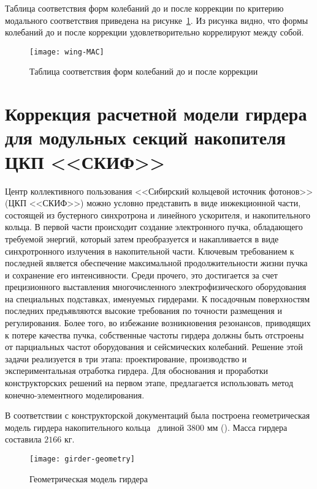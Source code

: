 Таблица соответствия форм колебаний до и после коррекции по критерию модального соответствия приведена на рисунке~\ref{fig:wing-MAC}. Из рисунка видно, что формы колебаний до и после коррекции удовлетворительно коррелируют между собой.

\begin{figure}[H]
	\centerfloat
	\texttt{[image: wing-MAC]}
	\caption{Таблица соответствия форм колебаний до и после коррекции} \label{fig:wing-MAC}
\end{figure}

\section{Коррекция расчетной модели гирдера для модульных секций накопителя ЦКП <<СКИФ>>}

Центр коллективного пользования <<Сибирский кольцевой источник фотонов>> (ЦКП <<СКИФ>>) можно условно представить в виде инжекционной части, состоящей из бустерного синхротрона и линейного ускорителя, и накопительного кольца. В первой части происходит создание электронного пучка, обладающего требуемой энергий, который затем преобразуется и накапливается в виде синхротронного излучения в накопительной части. Ключевым требованием к последней является обеспечение максимальной продолжительности жизни пучка и сохранение его интенсивности. Среди прочего, это достигается за счет прецизионного выставления многочисленного электрофизического оборудования на специальных подставках, именуемых гирдерами. К посадочным поверхностям последних предъявляются высокие требования по точности размещения и регулирования. Более того, во избежание возникновения резонансов, приводящих к потере качества пучка, собственные частоты гирдера должны быть отстроены от парциальных частот оборудования и сейсмических колебаний. Решение этой задачи реализуется в три этапа: проектирование, производство и экспериментальная отработка гирдера. Для обоснования и проработки конструкторских решений на первом этапе, предлагается использовать метод конечно-элементного моделирования.

В соответствии с конструкторской документаций была построена геометрическая модель гирдера накопительного кольца~ длиной $ 3800 $ мм (). Масса гирдера составила $ 2166 $ кг. 

\begin{figure}[H]
	\centering
	\texttt{[image: girder-geometry]}
	\caption{Геометрическая модель гирдера} \label{fig:girder-geometry}
\end{figure}

